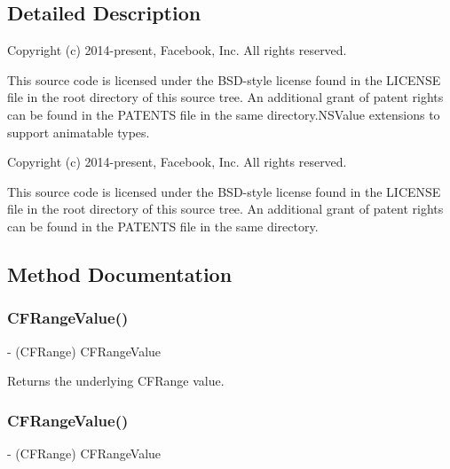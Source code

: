 \subsection{Detailed Description}
Copyright (c) 2014-\/present, Facebook, Inc. All rights reserved.

This source code is licensed under the B\+S\+D-\/style license found in the L\+I\+C\+E\+N\+SE file in the root directory of this source tree. An additional grant of patent rights can be found in the P\+A\+T\+E\+N\+TS file in the same directory.\+N\+S\+Value extensions to support animatable types.

Copyright (c) 2014-\/present, Facebook, Inc. All rights reserved.

This source code is licensed under the B\+S\+D-\/style license found in the L\+I\+C\+E\+N\+SE file in the root directory of this source tree. An additional grant of patent rights can be found in the P\+A\+T\+E\+N\+TS file in the same directory. 

\subsection{Method Documentation}
\mbox{\label{category_n_s_value_07_p_o_p_08_a35d9c5e3300a1ffc03ce6e25614b7eca}} 
\subsubsection{\texorpdfstring{C\+F\+Range\+Value()}{CFRangeValue()}\hspace{0.1cm}{\footnotesize\ttfamily [1/3]}}
{\footnotesize\ttfamily -\/ (C\+F\+Range) C\+F\+Range\+Value \begin{DoxyParamCaption}{ }\end{DoxyParamCaption}}

Returns the underlying C\+F\+Range value. \mbox{\label{category_n_s_value_07_p_o_p_08_a35d9c5e3300a1ffc03ce6e25614b7eca}} 
\subsubsection{\texorpdfstring{C\+F\+Range\+Value()}{CFRangeValue()}\hspace{0.1cm}{\footnotesize\ttfamily [2/3]}}
{\footnotesize\ttfamily -\/ (C\+F\+Range) C\+F\+Range\+Value \begin{DoxyParamCaption}{ }\end{DoxyParamCaption}}

